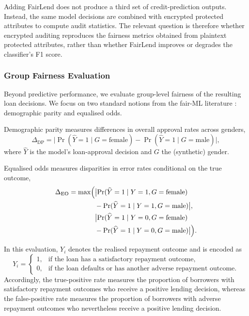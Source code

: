 \documentclass[a4paper,fleqn]{cas-dc}
\begin{document}
Adding FairLend does not produce a third set of credit-prediction outputs. Instead, the same model decisions are combined with encrypted protected attributes to compute audit statistics. The relevant question is therefore whether encrypted auditing reproduces the fairness metrics obtained from plaintext protected attributes, rather than whether FairLend improves or degrades the classifier's F1 score.

\subsubsection{Group Fairness Evaluation} \label{subsec:group_fairness_eval}

Beyond predictive performance, we evaluate group-level fairness of the resulting loan decisions. We focus on two standard notions from the fair-ML literature \cite{hardt2016equality}: demographic parity and equalised odds.


Demographic parity measures differences in overall approval rates across genders,
\[
\Delta_{\text{DP}} = \bigl| \Pr(\widehat{Y}=1 \mid G=\text{female}) - \Pr(\widehat{Y}=1 \mid G=\text{male}) \bigr|,
\]
where $\widehat{Y}$ is the model's loan-approval decision and $G$ the (synthetic) gender.

Equalised odds measures disparities in error rates conditional on the true outcome,
\begin{equation}
\begin{aligned}
\Delta_{\mathrm{EO}} = \max\Bigl(
    &\bigl| \Pr(\widehat{Y}=1 \mid Y=1, G=\text{female}) \\
     & - \Pr(\widehat{Y}=1 \mid Y=1, G=\text{male}) \bigr|, \\
    &\bigl| \Pr(\widehat{Y}=1 \mid Y=0, G=\text{female}) \\
     & - \Pr(\widehat{Y}=1 \mid Y=0, G=\text{male}) \bigr|
\Bigr).
\end{aligned}
\end{equation}


In this evaluation, $Y_i$ denotes the realised repayment outcome and is
encoded as
\[
Y_i=
\begin{cases}
1, & \text{if the loan has a satisfactory repayment outcome},\\
0, & \text{if the loan defaults or has another adverse repayment outcome}.
\end{cases}
\]
Accordingly, the true-positive rate measures the proportion of borrowers with
satisfactory repayment outcomes who receive a positive lending decision,
whereas the false-positive rate measures the proportion of borrowers with adverse repayment outcomes who nevertheless receive a positive lending decision.
\end{document}
